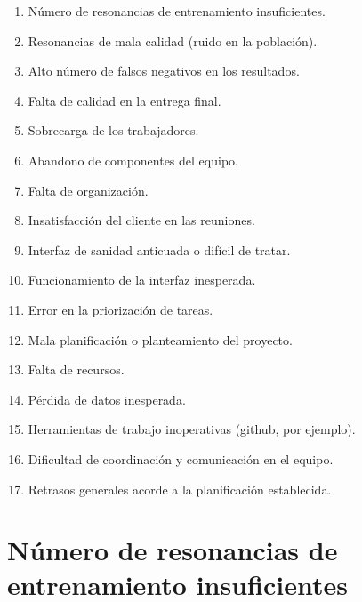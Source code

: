 \begin{enumerate}
	\item Número de resonancias de entrenamiento insuficientes.
	\item Resonancias de mala calidad (ruido en la población).
	\item Alto número de falsos negativos en los resultados.
	\item Falta de calidad en la entrega final.
	\item Sobrecarga de los trabajadores.
	\item Abandono de componentes del equipo.
	\item Falta de organización.
	\item Insatisfacción del cliente en las reuniones.
	\item Interfaz de sanidad anticuada o difícil de tratar.
	\item Funcionamiento de la interfaz inesperada.
	\item Error en la priorización de tareas.
	\item Mala planificación o planteamiento del proyecto.
	\item Falta de recursos.
	\item Pérdida de datos inesperada.
	\item Herramientas de trabajo inoperativas (github, por ejemplo).
	\item Dificultad de coordinación y comunicación en el equipo.
	\item Retrasos generales acorde a la planificación establecida.
\end{enumerate}

\section{Número de resonancias de entrenamiento insuficientes}

